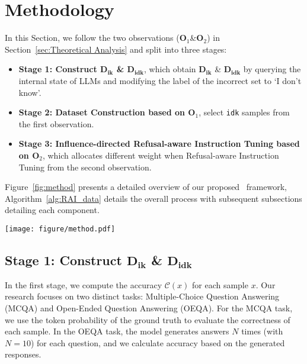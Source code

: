 \section{Methodology}
\label{sec:Methodology}
In this Section, we follow the two observations ($\mathbf{O}_1$\&$\mathbf{O}_2$) in Section~\ref{sec:Theoretical Analysis} and split \M into three stages: 
 
\begin{itemize}[leftmargin=*,noitemsep,topsep=2pt]
\item \textbf{Stage 1: Construct $\mathbf{D_{\text{ik}}}$ \& $\mathbf{D_{\text{idk}}}$}, which obtain $\mathbf{D_{\text{ik}}}$ \& $\mathbf{D_{\text{idk}}}$ by querying the internal state of LLMs and modifying the label of the incorrect set to `I don't know'.

\item \textbf{Stage 2: Dataset Construction based on  $\mathbf{O}_1$}, select \texttt{idk} samples from the first observation.

\item \textbf{Stage 3: Influence-directed Refusal-aware Instruction Tuning based on $\mathbf{O}_2$}, which allocates different weight when Refusal-aware Instruction Tuning from the second observation.
\end{itemize}
Figure~\ref{fig:method} presents a detailed overview of our proposed \M~framework, Algorithm~\ref{alg:RAI_data} details the overall process with subsequent subsections detailing each component.

\begin{figure*}[t]
  \centering
  \texttt{[image: figure/method.pdf]}
  \caption{\textbf{Overview of our framework.} \M contains three stages: 
  \textbf{(1)} Constructing datasets $\mathbf{D_{\text{ik}}}$ and $\mathbf{D_{\text{idk}}}$ by querying the internal state of LLMs.
  \textbf{(2)} Distilling the datasets to select \texttt{idk} samples based on the first observation $\mathbf{O}_1$.
  \textbf{(3)} Performing Influence-directed Refusal-aware Instruction Tuning using the second observation $\mathbf{O}_2$.
  }
  \label{fig:method}
\end{figure*}

\subsection{Stage 1: Construct $\mathbf{D_{\text{ik}}}$ \& $\mathbf{D_{\text{idk}}}$}
In the first stage, we compute the accuracy \(\mathcal{C}(x)\) for each sample \(x\). Our research focuses on two distinct tasks: Multiple-Choice Question Answering (MCQA) and Open-Ended Question Answering (OEQA). For the MCQA task, we use the token probability of the ground truth to evaluate the correctness of each sample. In the OEQA task, the model generates answers \(N\) times (with \(N = 10\)) for each question, and we calculate accuracy based on the generated responses. 

